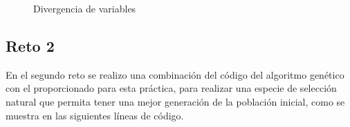 \documentclass[12pt, letterpaper] {article}
\begin{document}
\begin{figure}[H]
\centering
{}\vspace{1mm}
\caption{Divergencia de variables}\label{DV}
\end{figure}


\subsection{Reto 2}

En el segundo reto se realizo una combinación del código del algoritmo genético \cite{elisawebgen} con el proporcionado para esta práctica, para realizar una especie de selección natural que permita tener una mejor generación de la población inicial, como se muestra en las siguientes líneas de código.\\
\end{document}
